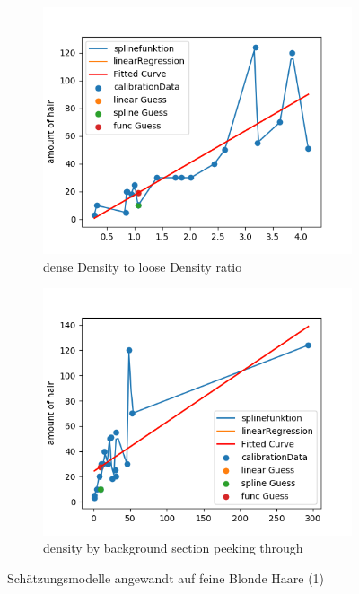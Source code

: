 \documentclass[german,a4paper, 12pt]{scrartcl}
\begin{document}
\begin{figure}[H]
	\medskip
	\begin{subfigure}{0.48\textwidth}
		\includegraphics[width=1.1\linewidth]{figBina/g5.png}
		\caption{dense Density to loose Density ratio} \label{fig:e}
	\end{subfigure}\hspace*{\fill}
	\begin{subfigure}{0.48\textwidth}
		\includegraphics[width=1.1\linewidth]{figBina/g6.png}
		\caption{density by background section peeking through} \label{fig:f}
	\end{subfigure}
	
	
	\caption{Schätzungsmodelle angewandt auf feine Blonde Haare (1)} \label{fig:1}
\end{figure}
\end{document}

